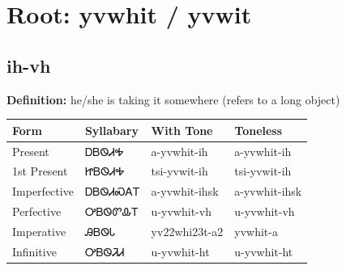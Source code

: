 \documentclass{article}%
\begin{document}
%
\normalsize%
\section*{Root: yvwhit / yvwit}%
\subsection*{ih-vh}%
\textbf{Definition: }%
he/she is taking it somewhere (refers to a long object)%
\\[0.5em]%
\begin{tabular}{|l|l|l|l|}%
\hline%
\textbf{Form}&\textbf{Syllabary}&\textbf{With Tone}&\textbf{Toneless}\\%
\hline%
Present&ᎠᏴᏫᏗᎭ&a{-}yvwhit{-}ih&a{-}yvwhit{-}ih\\%
1st Present&ᏥᏴᏫᏗᎭ&tsi{-}yvwit{-}ih&tsi{-}yvwit{-}ih\\%
Imperfective&ᎠᏴᏫᏗᏍᎪᎢ&a{-}yvwhit{-}ihsk&a{-}yvwhit{-}ihsk\\%
Perfective&ᎤᏴᏫᏛᎲᎢ&u{-}yvwhit{-}vh&u{-}yvwhit{-}vh\\%
Imperative&ᎯᏴᏫᏓ&yv22whi23t{-}a2&yvwhit{-}a\\%
Infinitive&ᎤᏴᏫᏘᏗ&u{-}yvwhit{-}ht&u{-}yvwhit{-}ht\\%
\hline%
\end{tabular}%
\\[1em]%
\end{document}

